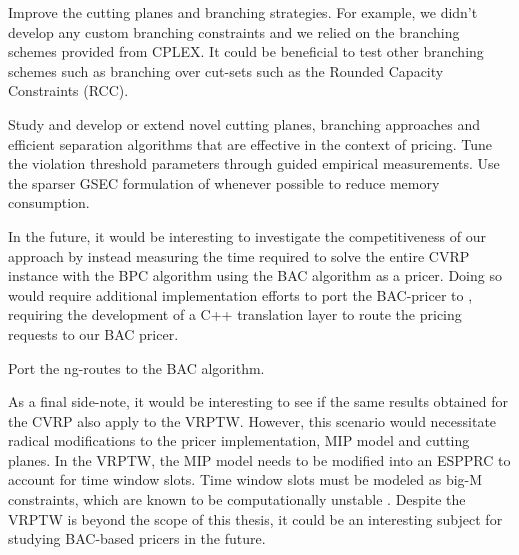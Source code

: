 Improve the cutting planes and branching strategies.
For example, we didn't develop any custom branching constraints
and we relied on the branching schemes provided from CPLEX.
It could be beneficial to test other branching schemes such as branching over cut-sets
such as the Rounded Capacity Constraints (RCC).

Study and develop or extend novel cutting planes, branching approaches and efficient separation algorithms
that are effective in the context of pricing.
Tune the violation threshold parameters through guided empirical measurements.
Use the sparser GSEC formulation of 
whenever possible to reduce memory consumption.

\medskip

In the future, it would be interesting to investigate the competitiveness of our approach
by instead measuring the time required to solve the entire CVRP instance
with the BPC algorithm using the BAC algorithm as a pricer.
Doing so would require additional implementation efforts to port the BAC-pricer to \bapcod{},
requiring the development of a C++ translation layer
to route the \bapcod{} pricing requests to our BAC pricer.

Port the ng-routes to the BAC algorithm.

As a final side-note, it would be interesting to see if
the same results obtained for the CVRP also apply to the VRPTW.
However, this scenario would necessitate radical modifications
to the pricer implementation, MIP model and cutting planes.
In the VRPTW, the MIP model needs to be modified into an ESPPRC
to account for time window slots.
Time window slots must be modeled as big-M constraints,
which are known to be computationally unstable \parencite{jepsen2008branchandcut}.
Despite the VRPTW is beyond the scope of this thesis,
it could be an interesting subject for studying BAC-based pricers in the future.




